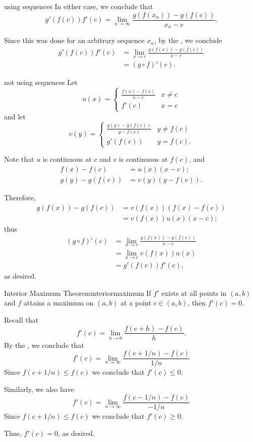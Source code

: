 \begin{dem}{using sequences}{}
	In either case, we conclude that \[
		g'(f(c)) f'(c) = \lim_{n \to \infty} \frac{g(f(x_n)) - g(f(c))}{x_n - c}.
	\]

	Since this was done for an arbitrary sequence \(x_n\), by the , we conclude
	\begin{align*}
		g'(f(c)) f'(c) &= \lim_{x \to c} \frac{g(f(x)) - g(f(c))}{x - c} \\
					   &= (g \circ f)'(c).
	\end{align*}
\end{dem}

\begin{dem}{not using sequences}{}	
	Let \[
		u(x) =
		\begin{cases}
			\frac{f(x) - f(c)}{x - c} & x \neq c \\
			f'(c) & x = c
		\end{cases}
	\]
	and let \[
		v(y) =
		\begin{cases}
			\frac{g(y) - g(f(c))}{y - f(c)} & y \neq f(c) \\
			g'(f(c)) & y = f(c).
		\end{cases}
	\]

	Note that \(u\) is continuous at \(c\) and \(v\) is continuous at \(f(c)\), and
	\begin{align*}
		f(x) - f(c)		&= u(x)(x-c); \\
		g(y) - g(f(c))	&= v(y)(y-f(c)).
	\end{align*}

	Therefore,
	\begin{align*}
		g(f(x)) - g(f(c)) &= v(f(x))(f(x) - f(c)) \\
						  &= v(f(x))u(x)(x - c);
	\end{align*}
	thus
	\begin{align*}
		(g \circ f)'(c) &= \lim_{x \to c} \frac{g(f(x)) - g(f(c))}{x - c} \\
						&= \lim_{x \to c} v(f(x))u(x) \\
						&= g'(f(c))f'(c),
	\end{align*}
	as desired.
\end{dem}

\begin{thm}{Interior Maximum Theorem}{interiormaximum}
	If \(f'\) exists at all points in \((a, b)\) and \(f\) attains a maximum on \((a, b)\) at a point \(c \in (a, b)\), then \(f'(c) = 0\).
\end{thm}

\begin{dem}{}{}
	Recall that  \[
		f'(c) = \lim_{h \to 0} \frac{f(c + h) - f(c)}{h}.
	\]
	By the , we conclude that \[
		f'(c) = \lim_{n \to \infty} \frac{f(c + 1/n) - f(c)}{1/n}
	\]
	Since \(f(c + 1/n) \leq f(c)\) we conclude that \(f'(c) \leq 0\).

	Similarly, we also have \[
		f'(c) = \lim_{n \to \infty} \frac{f(c - 1/n) - f(c)}{-1/n}
	\]
	Since \(f(c + 1/n) \leq f(c)\) we conclude that \(f'(c) \geq 0\).

	Thus, \(f'(c) = 0\), as desired.
\end{dem}

